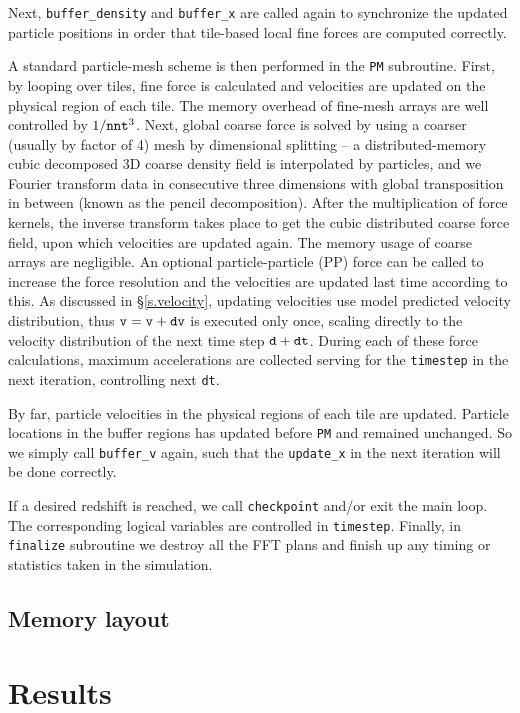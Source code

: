 \documentclass[10pt,twocolumn,preprint]{emulateapj}
\begin{document}
Next, {\tt buffer\_density} and {\tt buffer\_x} are called again to synchronize the updated particle positions in order that tile-based local fine forces are computed correctly.

A standard particle-mesh scheme is then performed in the {\tt PM} subroutine. First, by looping over tiles, fine force is calculated and velocities are updated on the physical region of each tile. The memory overhead of fine-mesh arrays are well controlled by $1/{\tt nnt}^3$. Next, global coarse force is solved by using a coarser (usually by factor of 4) mesh by dimensional splitting -- a distributed-memory cubic decomposed 3D coarse density field is interpolated by particles, and we Fourier transform data in consecutive three dimensions with global transposition in between (known as the pencil decomposition). After the multiplication of force kernels, the inverse transform takes place to get the cubic distributed coarse force field, upon which velocities are updated again. The memory usage of coarse arrays are negligible. An optional particle-particle (PP) force can be called to increase the force resolution and the velocities are updated last time according to this. As discussed in \S\ref{s.velocity}, updating velocities use model predicted velocity distribution, thus ${\tt v}={\tt v}+{\tt dv}$ is executed only once, scaling directly to the velocity distribution of the next time step ${\tt d}+{\tt dt}$. During each of these force calculations, maximum accelerations are collected serving for the {\tt timestep} in the next iteration, controlling next {\tt dt}.

By far, particle velocities in the physical regions of each tile are updated. Particle locations in the buffer regions has updated before {\tt PM} and remained unchanged. So we simply call {\tt buffer\_v} again, such that the {\tt update\_x} in the next iteration will be done correctly.

If a desired redshift is reached, we call {\tt checkpoint} and/or exit the main loop. The corresponding logical variables are controlled in {\tt timestep}. Finally, in {\tt finalize} subroutine we destroy all the FFT plans and finish up any timing or statistics taken in the simulation.


\subsection{Memory layout}


\section{Results}
\end{document}
